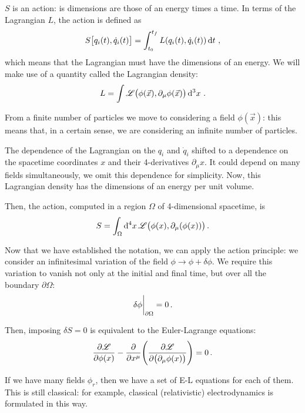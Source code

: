 \documentclass[main.tex]{subfiles}
\begin{document}
\(S\) is an action: is dimensions are those of an energy times a time. 
In terms of the Lagrangian \(L\), the action is defined as 
%
\begin{align}
S \qty[q_i(t), \dot{q}_{i}(t)] = \int_{t_0 }^{t_f} L (q_i (t), \dot{q}_{i}(t)) \dd{t}
\,,
\end{align}
%
which means that the Lagrangian must have the dimensions of an energy. 
We will make use of a quantity called the Lagrangian density: 
%
\begin{align}
L = \int \mathscr{L} \qty(\phi (\vec{x}), \partial_{\mu } \phi (\vec{x})) \dd[3]{x}
\,.
\end{align}

From a finite number of particles we move to considering a field \(\phi (\vec{x})\): this means that, in a certain sense, we are considering an infinite number of particles. 

The dependence of the Lagrangian on the \(q_i\) and \(\dot{q}_{i}\) shifted to a dependence on the spacetime coordinates \(x\) and their 4-derivatives \(\partial_{\mu } x\).
It could depend on many fields simultaneously, we omit this dependence for simplicity.
Now, this Lagrangian density has the dimensions of an energy per unit volume. 

Then, the action, computed in a region \(\Omega \) of 4-dimensional spacetime, is 
%
\begin{align}
S = \int_{\Omega } \dd[4]{x} \mathscr{L} \qty(\phi (x), \partial_{\mu } (\phi (x)))
\,.
\end{align}

Now that we have established the notation, we can apply the action principle: we consider an infinitesimal variation of the field \(\phi \rightarrow \phi  + \delta \phi \). 
We require this variation to vanish not only at the initial and final time, but over all the boundary \(\partial \Omega \): 
%
\begin{align}
\eval{\delta \phi }_{\partial \Omega } =0
\,.
\end{align}

Then, imposing \(\delta S =0\) is equivalent to the Euler-Lagrange equations: 
%
\begin{align}
\pdv{\mathscr{L}}{\phi (x)} - \pdv{}{x^{\mu }} \qty(\pdv{\mathscr{L}}{\qty(\partial_{\mu} \phi (x))}) = 0
\,.
\end{align}

If we have many fields \(\phi_{r}\), then we have a set of E-L equations for each of them. 
This is still classical: for example, classical (relativistic) electrodynamics is formulated in this way.
\end{document}
